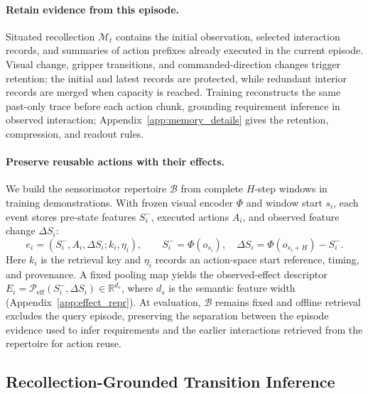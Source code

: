 \paragraph{Retain evidence from this episode.}
Situated recollection $\mathcal M_t$ contains the initial observation, selected interaction records, and summaries of action prefixes already executed in the current episode.
Visual change, gripper transitions, and commanded-direction changes trigger retention; the initial and latest records are protected, while redundant interior records are merged when capacity is reached.
Training reconstructs the same past-only trace before each action chunk, grounding requirement inference in observed interaction; Appendix~\ref{app:memory_details} gives the retention, compression, and readout rules.

\paragraph{Preserve reusable actions with their effects.}
We build the sensorimotor repertoire $\mathcal B$ from complete $H$-step windows in training demonstrations.
With frozen visual encoder $\Phi$ and window start $s_i$, each event stores pre-state features $S_i^-$, executed actions $A_i$, and observed feature change $\Delta S_i$:
\begin{equation}
 e_i=(S_i^-,A_i,\Delta S_i;k_i,\eta_i),\qquad
 S_i^-=\Phi(o_{s_i}),\quad
 \Delta S_i=\Phi(o_{s_i+H})-S_i^- .
 \label{eq:bank}
\end{equation}
Here $k_i$ is the retrieval key and $\eta_i$ records an action-space start reference, timing, and provenance.
A fixed pooling map yields the observed-effect descriptor $E_i=\mathcal P_{\mathrm{eff}}(S_i^-,\Delta S_i)\in\mathbb R^{d_s}$, where $d_s$ is the semantic feature width (Appendix~\ref{app:effect_repr}).
At evaluation, $\mathcal B$ remains fixed and offline retrieval excludes the query episode, preserving the separation between the episode evidence used to infer requirements and the earlier interactions retrieved from the repertoire for action reuse.

\subsection{Recollection-Grounded Transition Inference}
\label{sec:requirement}

